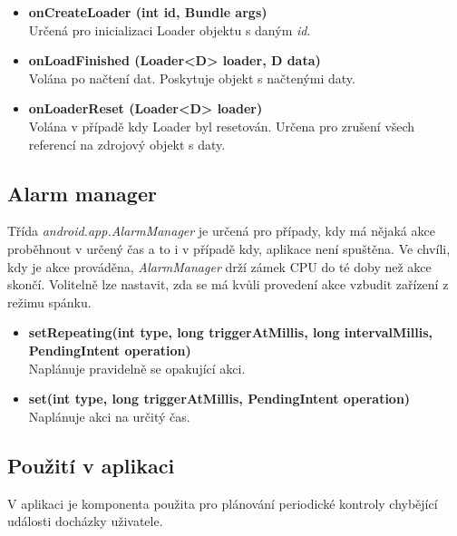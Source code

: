 \documentclass{diplomka}
\begin{document}
\begin{itemize}[]
\item \textbf{onCreateLoader (int id, Bundle args)}\\
Určená pro inicializaci Loader objektu s daným \emph{id}.
\item \textbf{onLoadFinished (Loader<D> loader, D data)}\\
Volána po načtení dat. Poskytuje objekt s načtenými daty.
\item \textbf{onLoaderReset (Loader<D> loader)}\\
Volána v případě kdy Loader byl resetován. Určena pro zrušení všech referencí na zdrojový objekt s daty.
\end{itemize}


\subsection{Alarm manager}
Třída \emph{android.app.AlarmManager} je určená pro případy, kdy má nějaká akce proběhnout v určený čas a to i v případě kdy, aplikace není spuštěna. Ve chvíli, kdy je akce prováděna, \emph{AlarmManager} drží zámek CPU do té doby než akce skončí. Volitelně lze nastavit, zda se má kvůli provedení akce vzbudit zařízení z režimu spánku.
\begin{itemize}[]
\item \textbf{setRepeating(int type, long triggerAtMillis, long intervalMillis, PendingIntent operation)}\\
Naplánuje pravidelně se opakující akci.
\item \textbf{set(int type, long triggerAtMillis, PendingIntent operation)}\\
Naplánuje akci na určitý čas.
\end{itemize}
\subsection*{Použití v aplikaci}
V aplikaci je komponenta použita pro plánování periodické kontroly chybějící události docházky uživatele.
\end{document}
